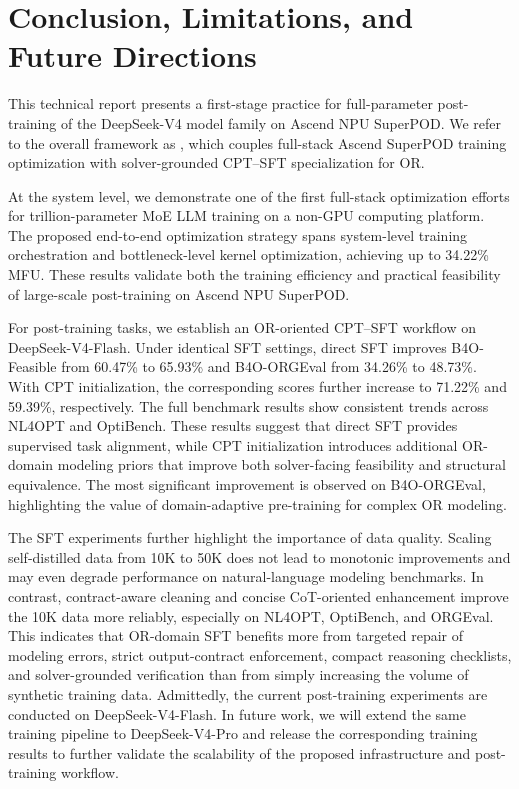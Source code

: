 \section{Conclusion, Limitations, and Future Directions}
\label{sec:conclusion_future}

This technical report presents a first-stage practice for full-parameter post-training of the DeepSeek-V4 model family on Ascend NPU SuperPOD. We refer to the overall framework as \textbf{\modelname}, which couples full-stack Ascend SuperPOD training optimization with solver-grounded CPT--SFT specialization for OR. 

At the system level, we demonstrate one of the first full-stack optimization efforts for trillion-parameter MoE LLM training on a non-GPU computing platform. The proposed end-to-end optimization strategy spans system-level training orchestration and bottleneck-level kernel optimization, achieving up to 34.22\% MFU. These results validate both the training efficiency and practical feasibility of large-scale post-training on Ascend NPU SuperPOD.

For post-training tasks, we establish an OR-oriented CPT--SFT workflow on DeepSeek-V4-Flash. Under identical SFT settings, direct SFT improves B4O-Feasible from 60.47\% to 65.93\% and B4O-ORGEval from 34.26\% to 48.73\%. With CPT initialization, the corresponding scores further increase to 71.22\% and 59.39\%, respectively. The full benchmark results show consistent trends across NL4OPT and OptiBench. These results suggest that direct SFT provides supervised task alignment, while CPT initialization introduces additional OR-domain modeling priors that improve both solver-facing feasibility and structural equivalence. The most significant improvement is observed on B4O-ORGEval, highlighting the value of domain-adaptive pre-training for complex OR modeling.



The SFT experiments further highlight the importance of data quality. Scaling self-distilled data from 10K to 50K does not lead to monotonic improvements and may even degrade performance on natural-language modeling benchmarks. In contrast, contract-aware cleaning and concise CoT-oriented enhancement improve the 10K data more reliably, especially on NL4OPT, OptiBench, and ORGEval. This indicates that OR-domain SFT benefits more from targeted repair of modeling errors, strict output-contract enforcement, compact reasoning checklists, and solver-grounded verification than from simply increasing the volume of synthetic training data.
Admittedly, the current post-training experiments are conducted on DeepSeek-V4-Flash. In future work, we will extend the same training pipeline to DeepSeek-V4-Pro and release the corresponding training results to further validate the scalability of the proposed infrastructure and post-training workflow.


